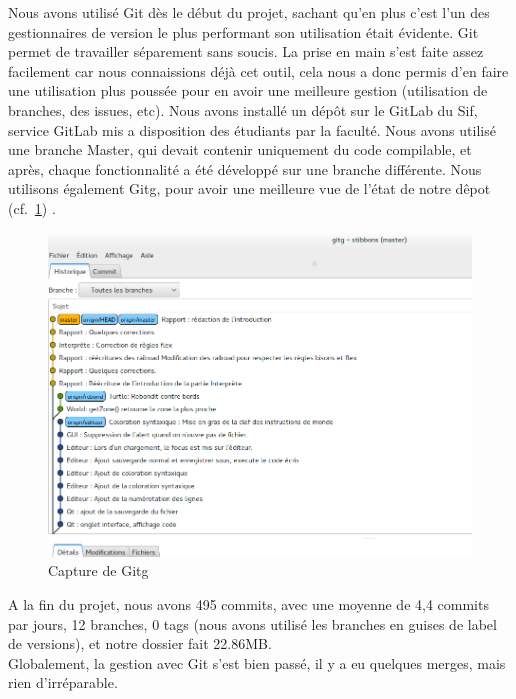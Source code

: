 Nous avons utilisé Git dès le début du projet, sachant qu'en plus c'est l'un des gestionnaires de version le plus performant son utilisation était évidente.
Git permet de travailler séparement sans soucis. La prise en main s'est faite assez facilement car nous connaissions déjà cet outil, cela nous a donc permis d'en faire une utilisation plus poussée pour en avoir une meilleure gestion (utilisation de branches, des issues, etc).
Nous avons installé un dépôt sur le GitLab du Sif, service GitLab mis a disposition des étudiants par la faculté.
 Nous avons utilisé une branche Master, qui devait contenir uniquement du code compilable, et après, chaque fonctionnalité a été développé sur une branche différente.
Nous utilisons également Gitg, pour avoir une meilleure vue de l'état de notre dêpot (cf.~\ref{Gitg}) .
\begin{figure}[h]
\caption{\label{Gitg} Capture de Gitg}
\includegraphics[scale=0.35]{doc/gestionProjet/gitbranche.png}
\end{figure}
A la fin du projet, nous avons 495 commits, avec une moyenne de 4,4 commits par jours, 12 branches, 0 tags (nous avons utilisé les branches en guises de label de versions), et notre dossier fait 22.86MB.\\
Globalement, la gestion avec Git s'est bien passé, il y a eu quelques merges, mais rien d'irréparable. 
